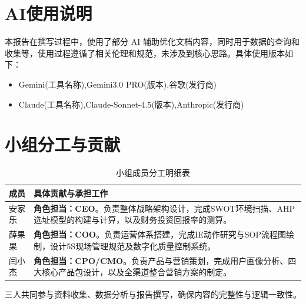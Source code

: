\documentclass{cumcmthesis}
\begin{document}
\newpage

\begin{appendices}
\section{AI使用说明}
本报告在撰写过程中，使用了部分 AI 辅助优化文档内容，同时用于数据的查询和收集等，使用过程遵循了相关伦理和规范，未涉及到核心思路。具体使用版本如下：
\begin{itemize}
    \item Gemini(工具名称),Gemini3.0 PRO(版本),谷歌(发行商)
    \item Claude(工具名称),Claude-Sonnet-4.5(版本),Anthropic(发行商)
\end{itemize}

\section{小组分工与贡献}
\begin{table}[H]
    \centering
    \caption{小组成员分工明细表}
    \begin{tabular}{l p{14cm}}
        \toprule
        \textbf{成员} & \textbf{具体贡献与承担工作} \\
        \midrule
        安家乐 & \textbf{角色担当：CEO}。负责整体战略架构设计，完成SWOT环境扫描、AHP选址模型的构建与计算，以及财务投资回报率的测算。 \\
        薛果果 & \textbf{角色担当：COO}。负责运营体系搭建，完成IE动作研究与SOP流程图绘制，设计5S现场管理规范及数字化质量控制系统。 \\
        闫小杰 & \textbf{角色担当：CPO/CMO}。负责产品与营销策划，完成用户画像分析、四大核心产品包设计，以及全渠道整合营销方案的制定。 \\
        \bottomrule
    \end{tabular}
\end{table}
三人共同参与资料收集、数据分析与报告撰写，确保内容的完整性与逻辑一致性。

\end{appendices}
\end{document}
